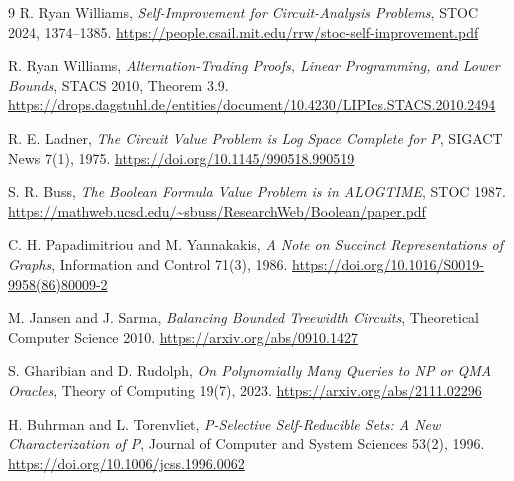 \documentclass[11pt]{article}
\begin{document}
\begin{thebibliography}{9}
R. Ryan Williams,
\emph{Self-Improvement for Circuit-Analysis Problems},
STOC 2024, 1374--1385.
\url{https://people.csail.mit.edu/rrw/stoc-self-improvement.pdf}

R. Ryan Williams,
\emph{Alternation-Trading Proofs, Linear Programming, and Lower Bounds},
STACS 2010, Theorem 3.9.
\url{https://drops.dagstuhl.de/entities/document/10.4230/LIPIcs.STACS.2010.2494}

R. E. Ladner,
\emph{The Circuit Value Problem is Log Space Complete for P},
SIGACT News 7(1), 1975.
\url{https://doi.org/10.1145/990518.990519}

S. R. Buss,
\emph{The Boolean Formula Value Problem is in ALOGTIME},
STOC 1987.
\url{https://mathweb.ucsd.edu/~sbuss/ResearchWeb/Boolean/paper.pdf}

C. H. Papadimitriou and M. Yannakakis,
\emph{A Note on Succinct Representations of Graphs},
Information and Control 71(3), 1986.
\url{https://doi.org/10.1016/S0019-9958(86)80009-2}

M. Jansen and J. Sarma,
\emph{Balancing Bounded Treewidth Circuits},
Theoretical Computer Science 2010.
\url{https://arxiv.org/abs/0910.1427}

S. Gharibian and D. Rudolph,
\emph{On Polynomially Many Queries to NP or QMA Oracles},
Theory of Computing 19(7), 2023.
\url{https://arxiv.org/abs/2111.02296}

H. Buhrman and L. Torenvliet,
\emph{P-Selective Self-Reducible Sets: A New Characterization of P},
Journal of Computer and System Sciences 53(2), 1996.
\url{https://doi.org/10.1006/jcss.1996.0062}
\end{thebibliography}
\end{document}
